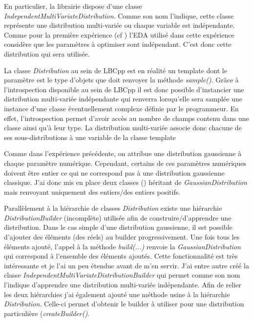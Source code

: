 \documentclass[a4paper, 11pt]{article}
\begin{document}
En particulier, la librairie dispose d'une classe \textit{IndependentMultiVariateDistribution}. Comme son nom l'indique, cette classe représente une distribution multi-variée ou chaque variable est indépendante. Comme pour la première expérience (cf )%
l'EDA utilisé dans cette expérience considère que les paramètres à optimiser sont indépendant. C'est donc cette distribution qui sera utilisée.

La classe \textit{Distribution} au sein de LBCpp est en réalité un template dont le paramètre est le type d'objets que doit renvoyer la méthode \textit{sample()}. Grâce à l'introspection disponible au sein de LBCpp il est donc possible d'instancier une distribution multi-variée indépendante qui renverra lorsqu'elle sera samplée %
une instance d'une classe éventuellement complexe définie par le programmeur. En effet, l'introspection permet d'avoir accès au nombre de champs contenu dans une classe ainsi qu'à leur type. La distribution multi-variée associe donc chacune de ses sous-distributions à une variable de la classe template %

Comme dans l'expérience précédente, on attribue une distribution gaussienne à chaque paramètre numérique. Cependant, certains de ces paramètres numériques doivent être entier ce qui ne correspond pas à une distribution gaussienne classique. J'ai donc mis en place deux classes ()%
héritant de \textit{GaussianDistribution} mais renvoyant uniquement des entiers/des entiers positifs.

Parallèlement à la hiérarchie de classes \textit{Distribution} existe une hiérarchie \textit{DistributionBuilder} (incomplète) utilisée afin de construire/d'apprendre une distribution. Dans le cas simple d'une distribution gaussienne, il est possible d'ajouter des éléments (des réels) au builder progressivement. Une fois tous les éléments ajouté, l'appel à la méthode \textit{build(...)} renvoie la \textit{GaussianDistribution} qui correspond à l'ensemble des éléments ajoutés. Cette fonctionnalité est très intéressante et je l'ai un peu étendue avant de m'en servir. J'ai entre autre créé la classe \textit{IndependentMultiVariateDistributionBuilder} qui permet comme son nom l'indique d'apprendre une distribution multi-variée indépendante. Afin de relier les deux hiérarchies j'ai également ajouté une méthode usine %
à la hiérarchie \textit{Distribution}. Celle-ci permet d'obtenir le builder à utiliser pour une distribution particulière (\textit{createBuilder()}.
\end{document}
